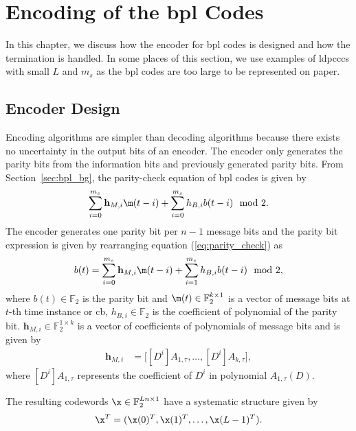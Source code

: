 \chapter{Encoding of the \acl{bpl} Codes}\label{ch:encode}
In this chapter, we discuss how the encoder for \ac{bpl} codes is designed and how the termination is handled. In some places of this section, we use examples of \acp{ldpccc} with small $L$ and $m_s$ as the \ac{bpl} codes are too large to be represented on paper.

\section{Encoder Design}\label{sec:enc_design}
Encoding algorithms are simpler than decoding algorithms because there exists no uncertainty in the output bits of an encoder. The encoder only generates the parity bits from the information bits and previously generated parity bits. From Section~\ref{sec:bpl_bg}, the parity-check equation of \ac{bpl} codes is given by
\begin{align}\label{eq:parity_check}
\sum_{i=0}^{m_s}\mathbf{h}_{M,i}\m(t-i)+\sum_{i=0}^{m_s}h_{B,i}b(t-i) \mod 2.
\end{align}
The encoder generates one parity bit per $n-1$ message bits and the parity bit expression is given by rearranging equation (\ref{eq:parity_check}) as
\begin{align}\label{eq:parity_bit}
b(t)=\sum_{i=0}^{m_s}\mathbf{h}_{M,i}\m(t-i)+\sum_{i=1}^{m_s}h_{B,i}b(t-i) \mod 2,
\end{align}
where $b(t)\in\mathbb{F}_2$ is the parity bit and $\m(t)\in\mathbb{F}_2^{k\times 1}$ is a vector of message bits at $t$-th time instance or \ac{cb}, $h_{B,i}\in\mathbb{F}_2$ is the coefficient of polynomial of the parity bit. $\mathbf{h}_{M,i}\in\mathbb{F}_2^{1\times k}$ is a vector of coefficients of polynomials of message bits and is given by
\begin{align}
\mathbf{h}_{M,i}&= \big[[D^i]A_{1,\tau},\dots,[D^i]A_{k,\tau}\big],
\end{align}
where $[D^i]A_{1,\tau}$ represents the coefficient of $D^i$ in polynomial $A_{1,\tau}(D)$.

The resulting codewords $\x\in\mathbb{F}_2^{Ln\times 1}$ have a systematic structure given by \begin{align}\x^T=(\x(0)^T,\x(1)^T,\dots,\x(L-1)^T).\end{align}

